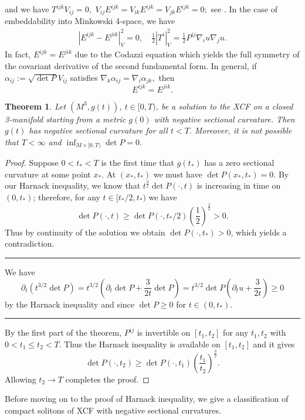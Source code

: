 \documentclass{amsart}
\newtheorem{theorem}{Theorem}
\theoremstyle{definition}
\theoremstyle{remark}
\numberwithin{equation}{section}
\newenvironment{note}{\hrule}{\hrule}
\begin{document}
 and we have $T^{ijk}V_{ij}=0,$ $V_{ij}E^{ijk}=V_{ik}E^{ijk}=V_{jk}E^{ijk}=0;$ see \cite[Prop. 9]{Chowcross2002}. In the case of embeddability into Minkowski 4-space, we have
 \begin{align*}
\left|E^{ijk}-E^{jik}\right|^2_V=0,\quad\frac{1}{2}\left|T^i\right|_V^2=\frac{1}{2}P^{ij}\nabla_i u\nabla_ju.
 \end{align*}
In fact, $E^{ijk}=E^{jik}$ due to the Codazzi equation which yields the full symmetry of the covariant derivative of the second fundamental form. In general, if 
$\alpha_{ij}:=\sqrt{\det P}V_{ij}$ satisfies
$\nabla_k\alpha_{ij}=\nabla_i\alpha_{jk},$
then \[E^{ijk}=E^{jik}.\]
\begin{theorem}
Let $(M^3,g(t))$, $t\in [0,T)$, be a solution to the XCF on a closed 3-manifold starting from a metric $g(0)$ with negative sectional curvature. Then $g(t)$ has negative sectional curvature for all $t<T.$
Moreover, it is not possible that $T<\infty$ and $\inf_{M\times [0,T)}\det P=0.$
\end{theorem}
\begin{proof}
Suppose $0<t_{\ast}<T$ is the first time that $g(t_{\ast})$ has a zero sectional curvature at some point $x_{\ast}$. At $(x_{\ast},t_{\ast})$ we must have $\det P(x_{\ast},t_{\ast})=0.$
By our Harnack inequality, we know that $t^{\frac{3}{2}}\det P(\cdot,t) $ is increasing in time on $(0,t_{\ast})$; therefore, for any $t\in [t_{\ast}/2, t_{\ast})$ we have
\[\det P(\cdot,t)\geq \det P(\cdot,t_{\ast}/2)\left(\frac{1}{2}\right)^{\frac{3}{2}}>0.\]
Thus by continuity of the solution we obtain $\det P(\cdot,t_{\ast})>0$, which yields a contradiction.

\begin{note}
We have
\[
\partial_t (t^{3/2} \det P) = t^{3/2}\left(\partial_t \det P + \frac{3}{2t} \det P\right) = t^{3/2} \det P\left(\partial_t u + \frac{3}{2t}\right) \geq 0
\]
by the Harnack inequality and since \(\det P \geq 0\) for \(t \in (0, t_{\ast})\).
\end{note}

By the first part of the theorem, $P^{ij}$ is invertible on $[t_1,t_2]$ for any $t_1,t_2$ with $0<t_1\leq t_2<T.$ Thus the Harnack inequality is available on $[t_1,t_2]$ and it gives
\[\det P(\cdot,t_2)\geq \det P(\cdot,t_1)\left(\frac{t_1}{t_2}\right)^{\frac{3}{2}}.\]
Allowing $t_2\to T$ completes the proof.
\end{proof}
Before moving on to the proof of Harnack inequality, we give a classification of compact solitons of XCF with negative sectional curvatures.
\end{document}
